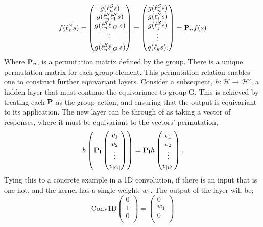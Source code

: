 \begin{equation}\label{eq:gs_perm}
	f(\ell_n^\mathcal{S}s) = \begin{pmatrix}
		g(\ell_n^\mathcal{S}s)                   \\
		g(\ell_n^\mathcal{S}\ell_1^\mathcal{S}s) \\
		g(\ell_n^\mathcal{S}\ell_{|G|}s)         \\
		\vdots                                   \\
		g(\ell_n^\mathcal{S}\ell_{|G|}s)         \\
	\end{pmatrix}
	= \begin{pmatrix}
		g(\ell_n^\mathcal{S}s) \\
		g(\ell_i^\mathcal{S}s) \\
		g(\ell^\mathcal{S}_js) \\
		\vdots                 \\
		g(\ell_{k}s).
	\end{pmatrix}
	= \mathbf{P}_n f(s)
\end{equation}
Where $\mathbf{P}_n$, is a permutation matrix defined by the group. There is a unique permutation matrix for each group element. This permutation relation enables one to construct further equivariant layers. Consider a subsequent, $h: \mathcal{H} \rightarrow \mathcal{H}'$, a hidden layer that must continue the equivariance to group G. This is achieved by treating each $\mathbf{P}$ as the group action, and ensuring that the output is equivariant to its application. The new layer can be through of as taking a vector of responses, where it must be equivariant to the vectors' permutation,
\begin{equation}
	h\left( \mathbf{P_i}
	\begin{pmatrix}
		v_1    \\
		v_2    \\
		\vdots \\
		v_{|G|}
	\end{pmatrix}
	\right) = \mathbf{P_i} h
	\begin{pmatrix}
		v_1    \\
		v_2    \\
		\vdots \\
		v_{|G|}
	\end{pmatrix}.
\end{equation}
Tying this to a concrete example in a 1D convolution, if there is an input that is one hot, and the kernel has a single weight, $w_1$. The output of the layer will be;
\begin{equation}
	\text{Conv1D}\begin{pmatrix}
		0 \\
		1 \\
		0 \\
	\end{pmatrix}
	= \begin{pmatrix}
		0   \\
		w_1 \\
		0   \\
	\end{pmatrix}
\end{equation}
